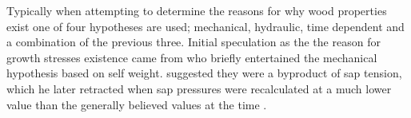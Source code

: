 Typically when attempting to determine the reasons for why wood properties exist
one of four hypotheses are used; mechanical, hydraulic, time dependent and a
combination of the previous three. Initial speculation as the the reason for
growth stresses existence came from \cite{MARTLEY01011928} who briefly entertained the
mechanical hypothesis based on self weight. \cite{jacobs1945l} suggested they were a
byproduct of sap tension, which he later retracted when sap
pressures were recalculated at a much lower value than the generally believed
values at the time \cite{jacobs1965l}. 